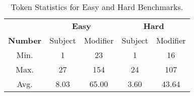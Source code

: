 \begin{table}[!t]
    \centering
    \small
    \renewcommand{\arraystretch}{1}  %
    \setlength{\tabcolsep}{5pt}
    \begin{tabular}{ccccc}
        \toprule
        & \multicolumn{2}{c}{\textbf{Easy}} & \multicolumn{2}{c}{\textbf{Hard}} \\
        \cmidrule{2-5}
        \multicolumn{1}{c}{\multirow{-2}{*}{\textbf{Number}}} & Subject & Modifier & Subject & Modifier \\
        \midrule
        Min. & 1 & 23 & 1 & 16\\
        Max. & 27 & 154 & 24 & 107\\
        Avg. &  8.03 & 65.00 & 3.60 & 43.64\\
        \bottomrule
    \end{tabular}
    \caption{Token Statistics for Easy and Hard Benchmarks.}
    \label{tb:data}
\end{table}